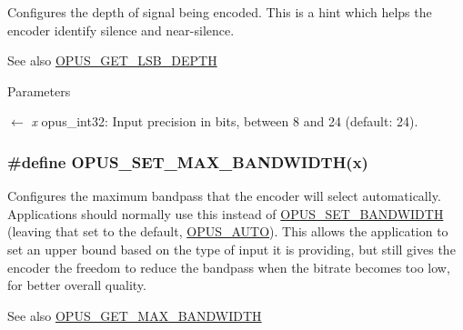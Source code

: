Configures the depth of signal being encoded. This is a hint which helps the encoder identify silence and near-\/silence. \begin{DoxySeeAlso}{See also}
\hyperlink{group__opus__encoderctls_gab5ecdfbbbabfaefc2f2ca79cf4a3b08f}{OPUS\_\-GET\_\-LSB\_\-DEPTH} 
\end{DoxySeeAlso}

\begin{DoxyParams}{Parameters}
\item[\mbox{$\leftarrow$} {\em x}]{\ttfamily opus\_\-int32}: Input precision in bits, between 8 and 24 (default: 24). \end{DoxyParams}
\hypertarget{group__opus__encoderctls_ga4f88288e89c595c07c61db316cc45289}{
\subsubsection[{OPUS\_\-SET\_\-MAX\_\-BANDWIDTH}]{\setlength{\rightskip}{0pt plus 5cm}\#define OPUS\_\-SET\_\-MAX\_\-BANDWIDTH(x)}}
\label{group__opus__encoderctls_ga4f88288e89c595c07c61db316cc45289}


Configures the maximum bandpass that the encoder will select automatically. Applications should normally use this instead of \hyperlink{group__opus__encoderctls_ga0178dabe5526d5b0667d81489cc93791}{OPUS\_\-SET\_\-BANDWIDTH} (leaving that set to the default, \hyperlink{group__opus__ctlvalues_ga1c5b3244b018ff4548d2d6bffa418472}{OPUS\_\-AUTO}). This allows the application to set an upper bound based on the type of input it is providing, but still gives the encoder the freedom to reduce the bandpass when the bitrate becomes too low, for better overall quality. \begin{DoxySeeAlso}{See also}
\hyperlink{group__opus__encoderctls_gaa3b5736de64792e1144ce12dfb87613c}{OPUS\_\-GET\_\-MAX\_\-BANDWIDTH} 
\end{DoxySeeAlso}

